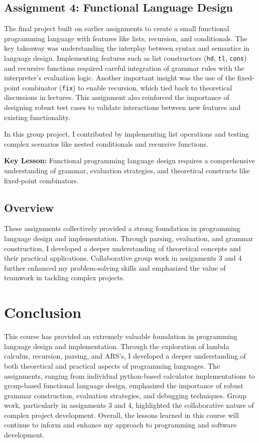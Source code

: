 \documentclass{article}
\theoremstyle{theorem}
\theoremstyle{definition}
\theoremstyle{remark}
\begin{document}
\subsection{Assignment 4: Functional Language Design}
The final project built on earlier assignments to create a small functional programming language with features like lists, recursion, and conditionals. The key takeaway was understanding the interplay between syntax and semantics in language design. Implementing features such as list constructors (\texttt{hd}, \texttt{tl}, \texttt{cons}) and recursive functions required careful integration of grammar rules with the interpreter's evaluation logic. Another important insight was the use of the fixed-point combinator (\texttt{fix}) to enable recursion, which tied back to theoretical discussions in lectures. This assignment also reinforced the importance of designing robust test cases to validate interactions between new features and existing functionality.

In this group project, I contributed by implementing list operations and testing complex scenarios like nested conditionals and recursive functions.

\textbf{Key Lesson:} Functional programming language design requires a comprehensive understanding of grammar, evaluation strategies, and theoretical constructs like fixed-point combinators.

\subsection{Overview}
These assignments collectively provided a strong foundation in programming language design and implementation. Through parsing, evaluation, and grammar construction, I developed a deeper understanding of theoretical concepts and their practical applications. Collaborative group work in assignments 3 and 4 further enhanced my problem-solving skills and emphasized the value of teamwork in tackling complex projects.



\section{Conclusion}\label{conclusion}

This course has provided an extremely valuable foundation in programming language design and implementation. Through the exploration of lambda calculus, recursion, parsing, and ARS's, I developed a deeper understanding of both theoretical and practical aspects of programming languages. The assignments, ranging from individual python-based calculator implementations to group-based functional language design, emphasized the importance of robust grammar construction, evaluation strategies, and debugging techniques. Group work, particularly in assignments 3 and 4, highlighted the collaborative nature of complex project development. Overall, the lessons learned in this course will continue to inform and enhance my approach to programming and software development.
\end{document}
